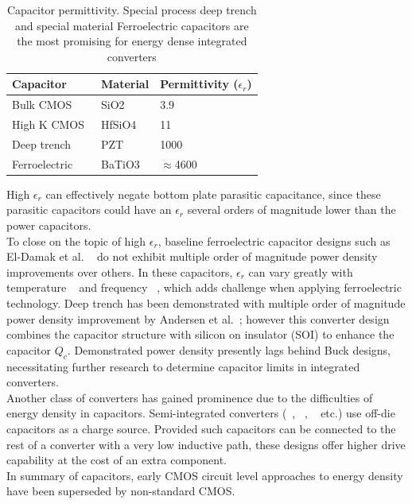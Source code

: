 \documentclass[letterpaper,twocolumn,10pt]{article}
\begin{document}
\begin{table}
    \begin{tabular}{|l|l|l|}
    \hline
    \textbf{Capacitor}               & \textbf{Material} & \textbf{Permittivity ($\epsilon_r$)} \\ \hline \hline
    Bulk CMOS~\cite{Robertson2004}               & SiO2     & 3.9          \\ \hline
    High K CMOS~\cite{Robertson2004}             & HfSiO4   & 11           \\ \hline
    Deep trench ~\cite{Johari2009} & PZT      & 1000         \\ \hline
    Ferroelectric~\cite{Lee2004}			& BaTiO3      & $\approx$4600         \\ \hline    
    \end{tabular}
    \caption{Capacitor permittivity. Special process deep trench and special material Ferroelectric capacitors are the most promising for energy dense integrated converters}
    \label{PermittivityTable}
\end{table}

High $\epsilon_r$ can effectively negate bottom plate parasitic capacitance, since these parasitic capacitors could have an $\epsilon_r$ several orders of magnitude lower than the power capacitors.\\ 
To close on the topic of high $\epsilon_r$, baseline ferroelectric capacitor designs such as El-Damak et al. ~\cite{Damak2013} do not exhibit multiple order of magnitude power density improvements over others. In these capacitors, $\epsilon_r$ can vary greatly with temperature ~\cite{Lee2004} and frequency ~\cite{Callister2012}, which adds challenge when applying ferroelectric technology. Deep trench has been demonstrated with multiple order of magnitude power density improvement by Andersen et al.~\cite{Andersen2013}; however this converter design combines the capacitor structure with silicon on insulator (SOI) to enhance the capacitor $Q_c$. %
Demonstrated power density presently lags behind Buck designs, necessitating further research to determine capacitor limits in integrated converters.\\
Another class of converters has gained prominence due to the difficulties of energy density in capacitors. Semi-integrated converters (~\cite{Pilawa2012}, ~\cite{Bathily2012}, ~\cite{Ng2012} etc.) use off-die capacitors as a charge source. Provided such capacitors can be connected to the rest of a converter with a very low inductive path, these designs offer higher drive capability at the cost of an extra component.\\
\indent In summary of capacitors, early CMOS circuit level approaches to energy density have been superseded by non-standard CMOS.
\end{document}
